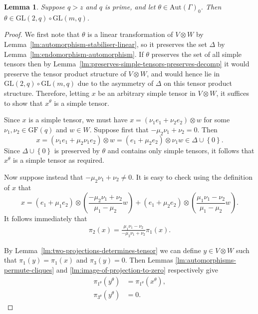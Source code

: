 \documentclass[10pt]{amsart}
\theoremstyle{definition}
\theoremstyle{plain}
\newtheorem{lemma}[lemma]{Lemma}
\theoremstyle{plain}
\theoremstyle{plain}
\theoremstyle{plain}
\newcommand{\Aut}{\mathrm{Aut}}
\newcommand{\GF}{\mathrm{GF}}
\newcommand{\GL}{\mathrm{GL}}
\begin{document}
\begin{lemma} \label{lm:automorphism-stabiliser-fixes-tensor-decomposition}
Suppose $q > z$ and $q$ is prime, and let $\theta \in \Aut{\left(\Gamma \right)}_0$. Then $\theta \in \GL{\left(2, q \right)} \circ \GL{\left(m, q \right)}$.
\end{lemma}
\begin{proof}
We first note that $\theta$ is a linear transformation of $V \otimes W$ by Lemma~\ref{lm:automorphism-stabiliser-linear}, so it preserves the set $\Delta$ by Lemma~\ref{lm:endomorphism-automorphism}. If $\theta$ preserves the set of all simple tensors then by Lemma~\ref{lm:preserves-simple-tensors-preserves-decomp} it would preserve the tensor product structure of $V \otimes W$, and would hence lie in $\GL{\left(2, q \right)} \circ \GL{\left(m, q \right)}$ due to the asymmetry of $\Delta$ on this tensor product structure. Therefore, letting $x$ be an arbitrary simple tensor in $V \otimes W$, it suffices to show that $x^\theta$ is a simple tensor.

Since $x$ is a simple tensor, we must have $x = \left(\nu_1 e_1 + \nu_2 e_2 \right) \otimes w$ for some $\nu_1, \nu_2 \in \GF{\left(q \right)}$ and $w \in W$. Suppose first that $-\mu_2 \nu_1 + \nu_2 = 0$. Then
\begin{displaymath}
    x = \left(\nu_1 e_1 + \mu_2 \nu_1 e_2 \right) \otimes w = \left(e_1 + \mu_2 e_2 \right) \otimes \nu_1 w \in \Delta \cup {\left\{0 \right\}}.
\end{displaymath}
Since $\Delta \cup \left\{0 \right\}$ is preserved by $\theta$ and contains only simple tensors, it follows that $x^\theta$ is a simple tensor as required.

Now suppose instead that $-\mu_2 \nu_1 + \nu_2 \neq 0$. It is easy to check using the definition of $x$ that
\begin{displaymath}
    x = \left(e_1 + \mu_1 e_2 \right) \otimes \left(\frac{-\mu_2 \nu_1 + \nu_2}{\mu_1 - \mu_2} w \right) + \left(e_1 + \mu_2 e_2 \right) \otimes {\left(\frac{\mu_1 \nu_1 - \nu_2}{\mu_1 - \mu_2} w \right)}.
\end{displaymath}
It follows immediately that
\begin{align}
    \pi_2{\left(x \right)} = \frac{\mu_1 \nu_1 - \nu_2}{-\mu_2 \nu_1 + \nu_2} \pi_1{\left(x \right)}. \label{eqn:projection-ratio}
\end{align}

By Lemma~\ref{lm:two-projections-determines-tensor} we can define $y \in V \otimes W$ such that $\pi_1{\left(y \right)} = \pi_1{\left(x \right)}$ and $\pi_3{\left(y \right)} = 0$. Then Lemmas \ref{lm:automorphisms-permute-cliques} and \ref{lm:image-of-projection-to-zero} respectively give
\begin{align}
    \pi_{1^\theta}{\left(y^\theta \right)} &= \pi_{1^\theta}{\left(x^\theta \right)}, \label{eqn:matching-projection-1-image} \\
    \pi_{3^\theta}{\left(y^\theta \right)} &= 0. \label{eqn:projection-3-image-zero}
\end{align}


\end{proof}
\end{document}
